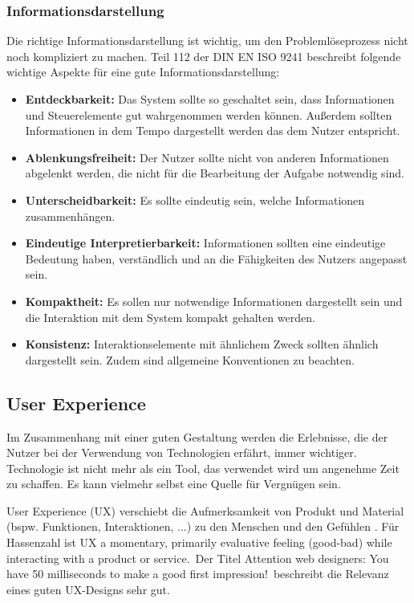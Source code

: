 \subsubsection*{Informationsdarstellung}
Die richtige Informationsdarstellung ist wichtig, um den Problemlöseprozess nicht noch kompliziert zu machen. Teil 112 \cite{ISO9241-112} der DIN EN ISO 9241 beschreibt folgende wichtige Aspekte für eine gute Informationsdarstellung:
\begin{itemize}
\item \textbf{Entdeckbarkeit:} Das System sollte so geschaltet sein, dass Informationen und Steuerelemente gut wahrgenommen werden können. Außerdem sollten Informationen in dem Tempo dargestellt werden das dem Nutzer entspricht.
\item \textbf{Ablenkungsfreiheit:} Der Nutzer sollte nicht von anderen Informationen abgelenkt werden, die nicht für die Bearbeitung der Aufgabe notwendig sind.
\item \textbf{Unterscheidbarkeit:} Es sollte eindeutig sein, welche Informationen zusammenhängen.
\item \textbf{Eindeutige Interpretierbarkeit:} Informationen sollten eine eindeutige Bedeutung haben, verständlich und an die Fähigkeiten des Nutzers angepasst sein.
\item \textbf{Kompaktheit:} Es sollen nur notwendige Informationen dargestellt sein und die Interaktion mit dem System kompakt gehalten werden.
\item \textbf{Konsistenz:} Interaktionselemente mit ähnlichem Zweck sollten ähnlich dargestellt sein. Zudem sind allgemeine Konventionen zu beachten.
\end{itemize}

\subsection{User Experience}
Im Zusammenhang mit einer guten Gestaltung werden die Erlebnisse, die der Nutzer bei der Verwendung von Technologien erfährt, immer wichtiger. Technologie ist nicht mehr als ein Tool, das verwendet wird um angenehme Zeit zu schaffen. Es kann vielmehr selbst eine Quelle für Vergnügen sein. \cite{Hassenzahl2008}

User Experience (UX) verschiebt die Aufmerksamkeit von Produkt und Material (bspw. Funktionen, Interaktionen, ...) zu den Menschen und den Gefühlen \cite{Hassenzahl2008}. Für Hassenzahl \citep[12]{Hassenzahl2008} ist UX \glqq a momentary, primarily evaluative feeling (good-bad) while interacting with a product or service.\grqq \ Der Titel \glqq Attention web designers: You have 50 milliseconds to make a good first impression!\grqq \ beschreibt die Relevanz eines guten UX-Designs sehr gut. 
\cite{Hassenzahl2006}

